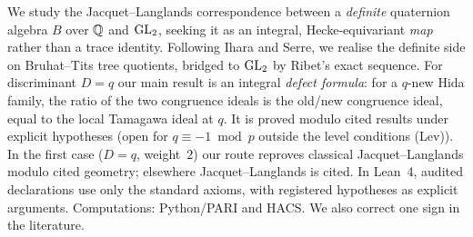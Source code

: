 We study the Jacquet--Langlands correspondence between a \emph{definite} quaternion algebra $B$ over $\mathbb{Q}$ and $\mathrm{GL}_2$,
seeking it as an integral, Hecke-equivariant \emph{map} rather than a trace identity. Following Ihara and Serre, we realise the
definite side on Bruhat--Tits tree quotients, bridged to $\mathrm{GL}_2$ by Ribet's exact sequence. For discriminant
$D=q$ our main result is an integral \emph{defect formula}: for a $q$-new Hida family, the ratio of the two congruence ideals
is the old/new congruence ideal, equal to the local Tamagawa ideal at $q$. It is proved modulo cited results under
explicit hypotheses (open for $q\equiv-1\bmod p$ outside the level conditions (Lev)). In the first case ($D=q$, weight~$2$) our route reproves classical Jacquet--Langlands modulo cited geometry; elsewhere Jacquet--Langlands is cited. In Lean~4, \ifdefined\GateAudited\GateAudited{}\fi{} audited declarations use only the standard
axioms, with registered hypotheses as explicit arguments. Computations: Python/PARI and HACS. We also correct one sign in the
literature.
